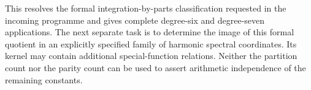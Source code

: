This resolves the formal integration-by-parts classification requested
in the incoming programme and gives complete degree-six and degree-seven
applications. The next separate task is to determine the image of this
formal quotient in an explicitly specified family of harmonic spectral
coordinates. Its kernel may contain additional special-function
relations. Neither the partition count nor the parity count can be
used to assert arithmetic independence of the remaining constants.

